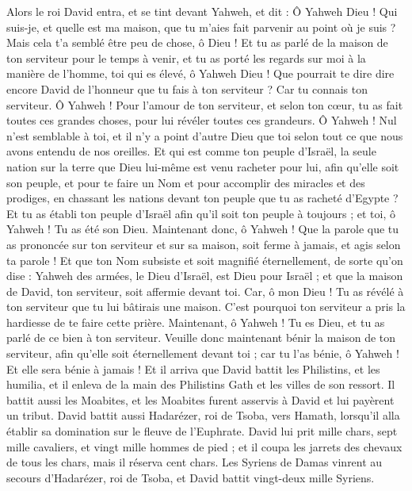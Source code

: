 \begin{multicols}{2}
Alors le roi David entra, et se tint devant Yahweh, et dit : Ô Yahweh Dieu ! Qui suis-je, et quelle est ma maison, que tu m'aies fait parvenir au point où je suis ?
Mais cela t'a semblé être peu de chose, ô Dieu ! Et tu as parlé de la maison de ton serviteur pour le temps à venir, et tu as porté les regards sur moi à la manière de l'homme, toi qui es élevé, ô Yahweh Dieu !
Que pourrait te dire dire encore David de l'honneur que tu fais à ton serviteur ? Car tu connais ton serviteur.
Ô Yahweh ! Pour l'amour de ton serviteur, et selon ton cœur, tu as fait toutes ces grandes choses, pour lui révéler toutes ces grandeurs.
Ô Yahweh ! Nul n’est semblable à toi, et il n'y a point d'autre Dieu que toi selon tout ce que nous avons entendu de nos oreilles.
Et qui est comme ton peuple d'Israël, la seule nation sur la terre que Dieu lui-même est venu racheter pour lui, afin qu'elle soit son peuple, et pour te faire un Nom et pour accomplir des miracles et des prodiges, en chassant les nations devant ton peuple que tu as racheté d'Egypte ?
Et tu as établi ton peuple d'Israël afin qu’il soit ton peuple à toujours ; et toi, ô Yahweh ! Tu as été son Dieu.
Maintenant donc, ô Yahweh ! Que la parole que tu as prononcée sur ton serviteur et sur sa maison, soit ferme à jamais, et agis selon ta parole !
Et que ton Nom subsiste et soit magnifié éternellement, de sorte qu'on dise : Yahweh des armées, le Dieu d'Israël, est Dieu pour Israël ; et que la maison de David, ton serviteur, soit affermie devant toi.
Car, ô mon Dieu ! Tu as révélé à ton serviteur que tu lui bâtirais une maison. C'est pourquoi ton serviteur a pris la hardiesse de te faire cette prière.
Maintenant, ô Yahweh ! Tu es Dieu, et tu as parlé de ce bien à ton serviteur.
Veuille donc maintenant bénir la maison de ton serviteur, afin qu'elle soit éternellement devant toi ; car tu l'as bénie, ô Yahweh ! Et elle sera bénie à jamais !
\VerseOne{}Et il arriva que David battit les Philistins, et les humilia, et il enleva de la main des Philistins Gath et les villes de son ressort.
Il battit aussi les Moabites, et les Moabites furent asservis à David et lui payèrent un tribut.
David battit aussi Hadarézer, roi de Tsoba, vers Hamath, lorsqu’il alla établir sa domination sur le fleuve de l'Euphrate.
David lui prit mille chars, sept mille cavaliers, et vingt mille hommes de pied ; et il coupa les jarrets des chevaux de tous les chars, mais il réserva cent chars.
Les Syriens de Damas vinrent au secours d’Hadarézer, roi de Tsoba, et David battit vingt-deux mille Syriens.

\end{multicols}
